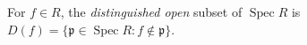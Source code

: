 
For $f\in R$, the \emph{distinguished open} subset of $\operatorname{Spec}R$ is $D(f)=\{\mathfrak p\in\operatorname{Spec}R:f\notin\mathfrak p\}$.
